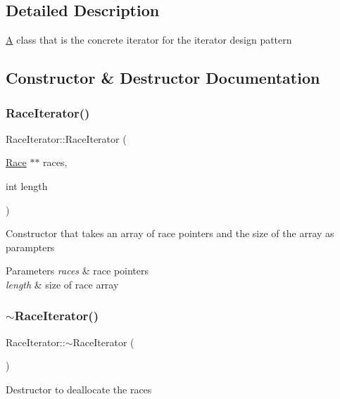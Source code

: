 \subsection{Detailed Description}
\hyperlink{classA}{A} class that is the concrete iterator for the iterator design pattern 

\subsection{Constructor \& Destructor Documentation}
\mbox{\label{classRaceIterator_a9610179f3d991dc1611574451d7306ea}} 
\subsubsection{\texorpdfstring{Race\+Iterator()}{RaceIterator()}}
{\footnotesize\ttfamily Race\+Iterator\+::\+Race\+Iterator (\begin{DoxyParamCaption}\item[{\hyperlink{classRace}{Race} $\ast$$\ast$}]{races,  }\item[{int}]{length }\end{DoxyParamCaption})}

Constructor that takes an array of race pointers and the size of the array as parampters 
\begin{DoxyParams}{Parameters}
{\em races} & race pointers \\
\hline
{\em length} & size of race array \\
\hline
\end{DoxyParams}
\mbox{\label{classRaceIterator_a38882308a5d81320ee9c04f783076555}} 
\subsubsection{\texorpdfstring{$\sim$\+Race\+Iterator()}{~RaceIterator()}}
{\footnotesize\ttfamily Race\+Iterator\+::$\sim$\+Race\+Iterator (\begin{DoxyParamCaption}{ }\end{DoxyParamCaption})}

Destructor to deallocate the races 

